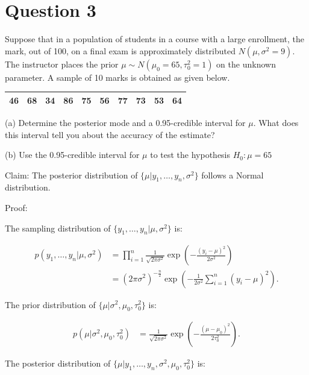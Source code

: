 \documentclass[11pt]{article}
\newcommand{\prob}[1]{
\begin{tcolorbox}[colback=green!5!white,colframe=green!75!black]
#1
\end{tcolorbox}
}
\begin{document}
\section{Question 3}

\prob{Suppose that in a population of students in a course with a large enrollment, the mark, out of 100, on a final exam is approximately distributed $N (\mu, \sigma^2 = 9)$. The instructor places the prior $\mu \sim N(\mu_0=65,\tau_0^2=1)$ on the unknown parameter. A sample of 10 marks is obtained as given below.

\begin{center}
\begin{tabular}{cccccccccc}
\hline
46 & 68 & 34 & 86 & 75 & 56 & 77 & 73 & 53 & 64\\
\hline
\end{tabular}
\end{center}

(a) Determine the posterior mode and a 0.95-credible interval for $\mu$. What does this interval tell you about the accuracy of the estimate?

(b) Use the 0.95-credible interval for $\mu$ to test the hypothesis $H_0: \mu = 65$
}

Claim: The posterior distribution of $\{\mu|y_1,\ldots,y_n,\sigma^2\}$ follows a Normal distribution.

Proof:

The sampling distribution of $\{y_1,\ldots,y_n | \mu, \sigma^2\}$ is: 

\begin{align*}
p(y_1,\ldots,y_n|\mu,\sigma^2) 
&= \prod_{i=1}^{n} \frac{1}{\sqrt{2\pi\sigma^2} }\exp\left( -\frac{(y_i-\mu)^2}{2\sigma^2}  \right)   \\
&=(2\pi\sigma^2)^{-\frac{n}{2}}\exp\left( -\frac{1}{2\sigma^2}\sum_{i=1}^{n} \left(y_i-\mu \right) ^2 \right) 
.\end{align*}

The prior distribution of $\{\mu|\sigma^2,\mu_0,\tau_0^2\}$ is:

\begin{align*}
p(\mu|\sigma^2,\mu_0,\tau_0^2)
&=\frac{1}{\sqrt{2\pi\sigma^2}} \exp\left( -\frac{\left( \mu-\mu_0 \right)^2 }{2\tau_0^2} \right)
.\end{align*}

The posterior distribution of $\{\mu|y_1,\ldots,y_n,\sigma^2,\mu_0,\tau_0^2\}$ is:
\end{document}
